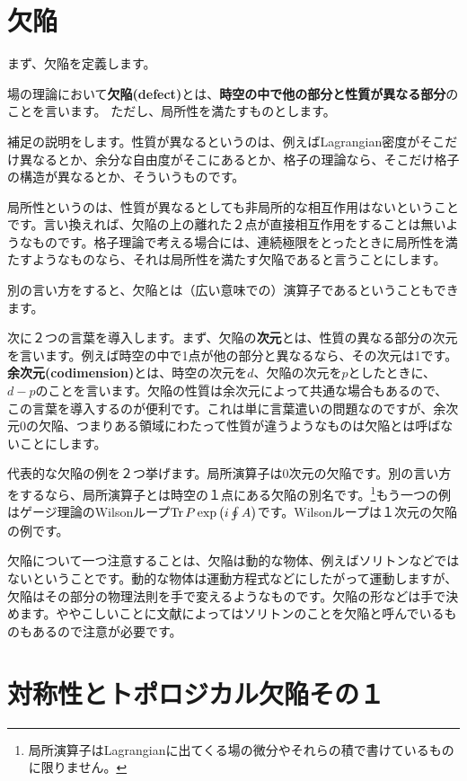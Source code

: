 \documentclass[report,paper=a4, fontsize=12pt, line_length=16cm, number_of_lines=33,dvipdfmx]{jlreq}
\newcommand{\kyou}[1]{{\sffamily \bfseries #1}}
\numberwithin{equation}{chapter}
\begin{document}
\section{欠陥}\label{sec:defect}

まず、欠陥を定義します。
\begin{emphasize}
  場の理論において\kyou{欠陥(defect)}とは、\kyou{時空の中で他の部分と性質が異なる部分}のことを言います。 ただし、局所性を満たすものとします。 
\end{emphasize}

補足の説明をします。性質が異なるというのは、例えばLagrangian密度がそこだけ異なるとか、余分な自由度がそこにあるとか、格子の理論なら、そこだけ格子の構造が異なるとか、そういうものです。

局所性というのは、性質が異なるとしても非局所的な相互作用はないということです。言い換えれば、欠陥の上の離れた２点が直接相互作用をすることは無いようなものです。格子理論で考える場合には、連続極限をとったときに局所性を満たすようなものなら、それは局所性を満たす欠陥であると言うことにします。

別の言い方をすると、欠陥とは（広い意味での）演算子であるということもできます。

次に２つの言葉を導入します。まず、欠陥の\kyou{次元}とは、性質の異なる部分の次元を言います。例えば時空の中で1点が他の部分と異なるなら、その次元は1です。\kyou{余次元(codimension)}とは、時空の次元を$d$、欠陥の次元を$p$としたときに、$d-p$のことを言います。欠陥の性質は余次元によって共通な場合もあるので、この言葉を導入するのが便利です。これは単に言葉遣いの問題なのですが、余次元0の欠陥、つまりある領域にわたって性質が違うようなものは欠陥とは呼ばないことにします。

代表的な欠陥の例を２つ挙げます。局所演算子は0次元の欠陥です。別の言い方をするなら、局所演算子とは時空の１点にある欠陥の別名です。\footnote{局所演算子はLagrangianに出てくる場の微分やそれらの積で書けているものに限りません。}もう一つの例はゲージ理論のWilsonループ$\Tr P \exp\left(i\oint A\right)$です。Wilsonループは１次元の欠陥の例です。

欠陥について一つ注意することは、欠陥は動的な物体、例えばソリトンなどではないということです。動的な物体は運動方程式などにしたがって運動しますが、欠陥はその部分の物理法則を手で変えるようなものです。欠陥の形などは手で決めます。ややこしいことに文献によってはソリトンのことを欠陥と呼んでいるものもあるので注意が必要です。

\section{対称性とトポロジカル欠陥その１}
\end{document}
